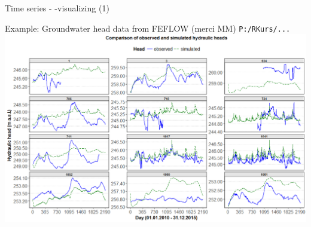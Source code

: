 \documentclass[8pt,ignorenonframetext,]{beamer}
\begin{document}
\begin{frame}[fragile]{Time series - -visualizing (1)}

Example: Groundwater head data from FEFLOW (merci MM)
\texttt{P:/RKurs/...}
\includegraphics{imgPres/time_series_head_analysis01.png}

\end{frame}
\end{document}
